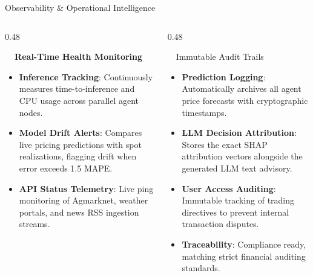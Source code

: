 \documentclass{beamer}
\begin{document}
\begin{frame}{Observability \& Operational Intelligence}
\vspace{-0.2cm}

\begin{columns}[T]
    \begin{column}{0.48\textwidth}
        \begin{smallcard}[0.98\textwidth, top=3pt, bottom=3pt, left=4pt, right=4pt, boxsep=0.5pt]
            \centering \textbf{\textcolor{primaryDark}{\small {}~~Real-Time Health Monitoring}}
            \vspace{0.08cm}
            \fontsize{6.8pt}{8.2pt}\selectfont
            \begin{itemize}\setlength\itemsep{4.5pt}\setlength\parskip{0pt}
                \item \textbf{Inference Tracking}: Continuously measures time-to-inference and CPU usage across parallel agent nodes.
                \item \textbf{Model Drift Alerts}: Compares live pricing predictions with spot realizations, flagging drift when error exceeds 1.5 MAPE.
                \item \textbf{API Status Telemetry}: Live ping monitoring of Agmarknet, weather portals, and news RSS ingestion streams.
            \end{itemize}
        \end{smallcard}
    \end{column}
    
    \begin{column}{0.48\textwidth}
        \begin{orangecard}[height=4.8cm]{~~Immutable Audit Trails}
            \fontsize{6.8pt}{8.2pt}\selectfont
            \begin{itemize}\setlength\itemsep{3pt}\setlength\parskip{0pt}
                \item \textbf{Prediction Logging}: Automatically archives all agent price forecasts with cryptographic timestamps.
                \item \textbf{LLM Decision Attribution}: Stores the exact SHAP attribution vectors alongside the generated LLM text advisory.
                \item \textbf{User Access Auditing}: Immutable tracking of trading directives to prevent internal transaction disputes.
                \item \textbf{Traceability}: Compliance ready, matching strict financial auditing standards.
            \end{itemize}
        \end{orangecard}
    \end{column}
\end{columns}


\end{frame}
\end{document}
